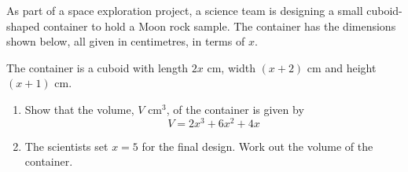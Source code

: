 \begin{question}
\noindent As part of a space exploration project, a science team is designing a small cuboid-shaped container to hold a Moon rock sample. The container has the dimensions shown below, all given in centimetres, in terms of $x$.

\begin{center}
\end{center}

\noindent The container is a cuboid with length $2x$ cm, width $(x+2)$ cm and height $(x+1)$ cm.

\begin{enumerate}
    \item[(a)] Show that the volume, $V$ cm$^3$, of the container is given by
    \[ V = 2x^3 + 6x^2 + 4x \]
    \vspace{4.5cm}

    \item[(b)] The scientists set $x = 5$ for the final design. Work out the volume of the container.
    \vspace{3cm}
\end{enumerate}
\end{question}